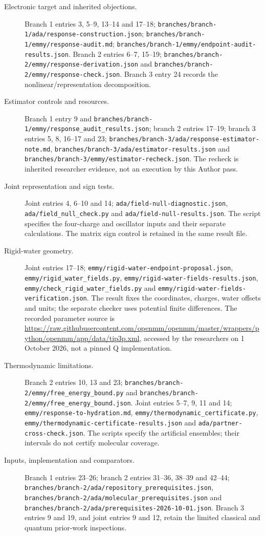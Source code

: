 \documentclass{article}
\begin{document}
\begin{description}
\item[Electronic target and inherited objections.] Branch 1 entries 3, 5--9, 13--14 and 17--18; \texttt{branches/branch-1/ada/response-construction.json}; \texttt{branches/branch-1/emmy/response-audit.md}; \texttt{branches/branch-1/emmy/endpoint-audit-results.json}. Branch 2 entries 6--7, 15--19; \texttt{branches/branch-2/emmy/response-derivation.json} and \texttt{branches/branch-2/emmy/response-check.json}. Branch 3 entry 24 records the nonlinear/representation decomposition.
\item[Estimator controls and resources.] Branch 1 entry 9 and \texttt{branches/branch-1/emmy/response\_audit\_results.json}; branch 2 entries 17--19; branch 3 entries 5, 8, 16--17 and 23; \texttt{branches/branch-3/ada/response-estimator-note.md}, \texttt{branches/branch-3/ada/estimator-results.json} and \texttt{branches/branch-3/emmy/estimator-recheck.json}. The recheck is inherited researcher evidence, not an execution by this Author pass.
\item[Joint representation and sign tests.] Joint entries 4, 6--10 and 14; \texttt{ada/field-null-diagnostic.json}, \texttt{ada/field\_null\_check.py} and \texttt{ada/field-null-results.json}. The script specifies the four-charge and oscillator inputs and their separate calculations. The matrix sign control is retained in the same result file.
\item[Rigid-water geometry.] Joint entries 17--18; \texttt{emmy/rigid-water-endpoint-proposal.json}, \texttt{emmy/rigid\_water\_fields.py}, \texttt{emmy/rigid-water-fields-results.json}, \texttt{emmy/check\_rigid\_water\_fields.py} and \texttt{emmy/rigid-water-fields-verification.json}. The result fixes the coordinates, charges, water offsets and units; the separate checker uses potential finite differences. The recorded parameter source is \url{https://raw.githubusercontent.com/openmm/openmm/master/wrappers/python/openmm/app/data/tip3p.xml}, accessed by the researchers on 1 October 2026, not a pinned Q implementation.
\item[Thermodynamic limitations.] Branch 2 entries 10, 13 and 23; \texttt{branches/branch-2/emmy/free\_energy\_bound.py} and \texttt{branches/branch-2/emmy/free\_energy\_bound.json}. Joint entries 5--7, 9, 11 and 14; \texttt{emmy/response-to-hydration.md}, \texttt{emmy/thermodynamic\_certificate.py}, \texttt{emmy/thermodynamic-certificate-results.json} and \texttt{ada/partner-cross-check.json}. The scripts specify the artificial ensembles; their intervals do not certify molecular coverage.
\item[Inputs, implementation and comparators.] Branch 1 entries 23--26; branch 2 entries 31--36, 38--39 and 42--44; \texttt{branches/branch-2/ada/repository\_prerequisites.json}, \texttt{branches/branch-2/ada/molecular\_prerequisites.json} and \texttt{branches/branch-2/ada/prerequisites-2026-10-01.json}. Branch 3 entries 9 and 19, and joint entries 9 and 12, retain the limited classical and quantum prior-work inspections.
\end{description}
\end{document}
